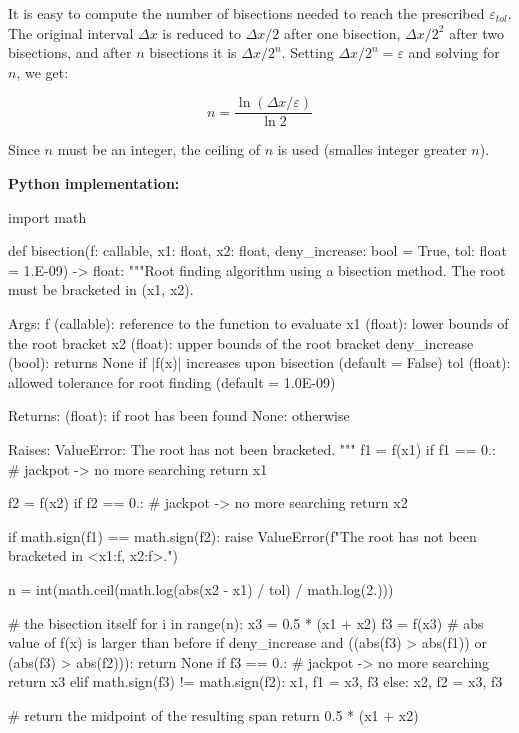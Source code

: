 It is easy to compute the number of bisections needed to reach the prescribed $ \varepsilon_{tol} $.
The original interval $ \Delta x $ is reduced to $ \Delta x / 2 $ after one bisection,
$ \Delta x / 2^2 $ after two bisections, and after $ n $ bisections it is
$ \Delta x/2^n $. Setting $ \Delta x / 2^n = \varepsilon $ and solving for $ n $, we get:

\begin{equation}
    n = \frac{\ln{ \left( \Delta x / \varepsilon \right) } }
             {\ln 2}
\end{equation}

Since $ n $ must be an integer, the ceiling of $ n $ is used (smalles integer greater $ n $).

\newpage
\textbf{Python implementation:}

\begin{python}
import math

def bisection(f: callable, x1: float, x2: float,
              deny_increase: bool = True, tol: float = 1.E-09) -> float:
    """Root finding algorithm using a bisection method. The root must be bracketed in
    (x1, x2).

    Args:
        f (callable):         reference to the function to evaluate
        x1 (float):           lower bounds of the root bracket
        x2 (float):           upper bounds of the root bracket
        deny_increase (bool): returns None if |f(x)| increases upon bisection
                              (default = False)
        tol (float):          allowed tolerance for root finding
                              (default = 1.0E-09)

    Returns:
        (float): if root has been found
        None:    otherwise

    Raises:
        ValueError: The root has not been bracketed.
    """
    f1 = f(x1)
    if f1 == 0.: # jackpot -> no more searching
        return x1

    f2 = f(x2)
    if f2 == 0.: # jackpot -> no more searching
        return x2

    if math.sign(f1) == math.sign(f2):
        raise ValueError(f"The root has not been bracketed in <{x1:f}, {x2:f}>.")

    n = int(math.ceil(math.log(abs(x2 - x1) / tol) / math.log(2.)))

    # the bisection itself
    for i in range(n):
        x3 = 0.5 * (x1 + x2)
        f3 = f(x3)
        # abs value of f(x) is larger than before
        if deny_increase and ((abs(f3) > abs(f1)) or (abs(f3) > abs(f2))):
            return None
        if f3 == 0.: # jackpot -> no more searching
            return x3
        elif math.sign(f3) != math.sign(f2):
            x1, f1 = x3, f3
        else:
            x2, f2 = x3, f3

    # return the midpoint of the resulting span
    return 0.5 * (x1 + x2)

\end{python}


